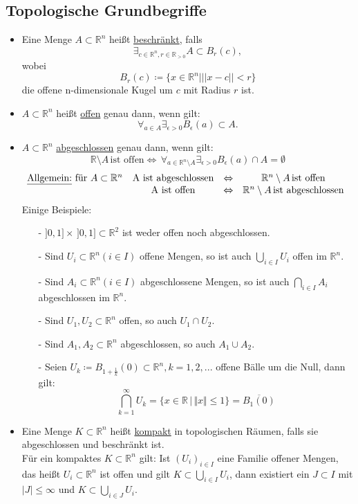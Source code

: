 \subsection*{Topologische Grundbegriffe}
\begin{itemize}
	\item Eine Menge $A \subset \mathbb{R}^n$ heißt \underline{beschränkt}, falls
	\[\exists_{c \in \mathbb{R}^n, r \in \mathbb{R}_{>0}} A \subset B_r(c),\] wobei \[B_r(c)\coloneqq \{x \in \mathbb{R}^n| ||x-c|| < r\}\] die offene n-dimensionale Kugel um $c$ mit Radius $r$ ist.
	\item $A \subset \mathbb{R}^n$ heißt \underline{offen} genau dann, wenn gilt:
	\[\forall_{a \in A} \exists_{\epsilon > 0} B_{\epsilon}(a) \subset A.\]
	\item $A \subset \mathbb{R}^n$ \underline{abgeschlossen} genau dann, wenn gilt:
	\[\mathbb{R} \setminus A \, \textrm{ist offen} \Leftrightarrow \, \forall_{a \in \mathbb{R}^n \setminus A} \exists_{\epsilon > 0} B_{\epsilon}(a) \cap A = \emptyset\]
	\begin{equation*}
		\begin{matrix}
		\textrm{\underline{Allgemein:} für } A \subset \mathbb{R}^n & \textrm{A ist abgeschlossen} & \Leftrightarrow & \mathbb{R}^n \setminus A \, \textrm{ist offen}\\
		& \textrm{A ist offen} & \Leftrightarrow & \mathbb{R}^n \setminus A \, \textrm{ist abgeschlossen}
		\end{matrix}\\
	\end{equation*}
	Einige Beispiele:
	\begin{itemize}
		\item[-] $]0,1] \times \,]0,1] \subset \mathbb{R}^2$ ist weder offen noch abgeschlossen.
		\item[-] Sind $U_i \subset \mathbb{R}^n (i \in I)$ offene Mengen, so ist auch $\bigcup_{i \in I} U_i$ offen im $\mathbb{R}^n$.
		\item[-] Sind $A_i \subset \mathbb{R}^n (i \in I)$ abgeschlossene Mengen, so ist auch $\bigcap_{i \in I} A_i$ abgeschlossen im $\mathbb{R}^n$.
		\item[-] Sind $U_1, U_2 \subset \mathbb{R}^n$ offen, so auch $U_1 \cap U_2$.
		\item[-] Sind $A_1, A_2 \subset \mathbb{R}^n$ abgeschlossen, so auch $A_1 \cup A_2$.
		\item[-] Seien $U_k\coloneqq B_{1+\frac{1}{k}} (0) \subset \mathbb{R}^n, k=1,2,...$ offene Bälle um die Null, dann gilt:
		\[\bigcap_{k=1}^\infty U_k = \{x \in \mathbb{R}\, |\, \Vert x\Vert \leq 1\} = \overline{B_1(0)}\]
	\end{itemize}
	\item Eine Menge $K \subset \mathbb{R}^n$ heißt \underline{kompakt} in topologischen Räumen, falls sie abgeschlossen und beschränkt ist.\\
	Für  ein kompaktes $K \subset \mathbb{R}^n$ gilt: Ist $(U_i)_{i \in I}$ eine Familie offener Mengen, das heißt $U_i \subset \mathbb{R}^n$ ist offen und gilt $K \subset \bigcup_{i \in I} U_i$, dann existiert ein $J \subset I$ mit $|J| \le \infty$ und $K \subset \bigcup_{i \in J} U_i$.\\
	

\end{itemize}
